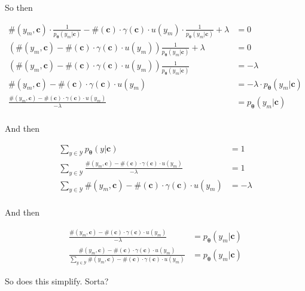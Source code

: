 \documentclass{article}
\newcommand{\vtheta}{\boldsymbol{\theta}}
\newcommand{\model}{p_{\vtheta}}
\newcommand{\context}{\boldsymbol{c}}
\begin{document}
		So then 
		
		\begin{align}
			\#(y_m, \context)\cdot  \frac{1}{\model(y_m|\context)} - \#(\context)\cdot \gamma(\context)\cdot u(y_m)\cdot\frac{1}{\model(y_m|\context)} + \lambda &= 0\\
			(\#(y_m, \context) - \#(\context)\cdot \gamma(\context)\cdot u(y_m))   \frac{1}{\model(y_m|\context)} + \lambda &= 0\\
			(\#(y_m, \context) - \#(\context)\cdot \gamma(\context)\cdot u(y_m))   \frac{1}{\model(y_m|\context)} &= - \lambda \\
			\#(y_m, \context) - \#(\context)\cdot \gamma(\context)\cdot u(y_m)  &= - \lambda\cdot \model(y_m|\context) \\
			\frac{\#(y_m, \context) - \#(\context)\cdot \gamma(\context)\cdot u(y_m)}{-\lambda}  &=  \model(y_m|\context) \\
		\end{align}	
		
		And then
		
		\begin{align}
			\sum_{y\in\mathcal{Y}} \model(y|\context) &= 1\\
			\sum_{y\in\mathcal{Y}} \frac{\#(y_m, \context) - \#(\context)\cdot \gamma(\context)\cdot u(y_m)}{-\lambda} &= 1\\
			  \sum_{y\in\mathcal{Y}} \#(y_m, \context) - \#(\context)\cdot \gamma(\context)\cdot u(y_m) &= -\lambda\\
		\end{align}
		
		And then
		
		\begin{align}
			\frac{\#(y_m, \context) - \#(\context)\cdot \gamma(\context)\cdot u(y_m)}{-\lambda}  &=  \model(y_m|\context) \\
			\frac{\#(y_m, \context) - \#(\context)\cdot \gamma(\context)\cdot u(y_m)}{\sum_{y\in\mathcal{Y}} \#(y_m, \context) - \#(\context)\cdot \gamma(\context)\cdot u(y_m)}  &=  \model(y_m|\context)
		\end{align}
		
		So does this simplify. Sorta?
		
\end{document}
